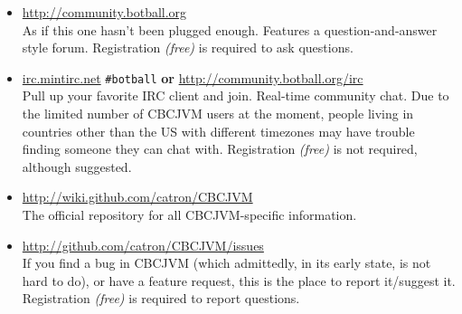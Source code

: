 \documentclass[12pt,letterpaper]{article}
\begin{document}
\begin{itemize}
\item \url{http://community.botball.org}\\
      As if this one hasn't been plugged enough. Features a question-and-answer style forum. Registration \textit{(free)} is required to ask questions.
\item \url{irc.mintirc.net} \texttt{{\#}botball} \textbf{or} \url{http://community.botball.org/irc}\\
      Pull up your favorite IRC client and join. Real-time community chat. Due to the limited number of CBCJVM users at the moment, people living in countries other than the US with different timezones may have trouble finding someone they can chat with. Registration \textit{(free)} is not required, although suggested.
\item \url{http://wiki.github.com/catron/CBCJVM}\\
      The official repository for all CBCJVM-specific information.
\item \url{http://github.com/catron/CBCJVM/issues}\\
      If you find a bug in CBCJVM (which admittedly, in its early state, is not hard to do), or have a feature request, this is the place to report it/suggest it. Registration \textit{(free)} is required to report questions.
\end{itemize}
\end{document}
